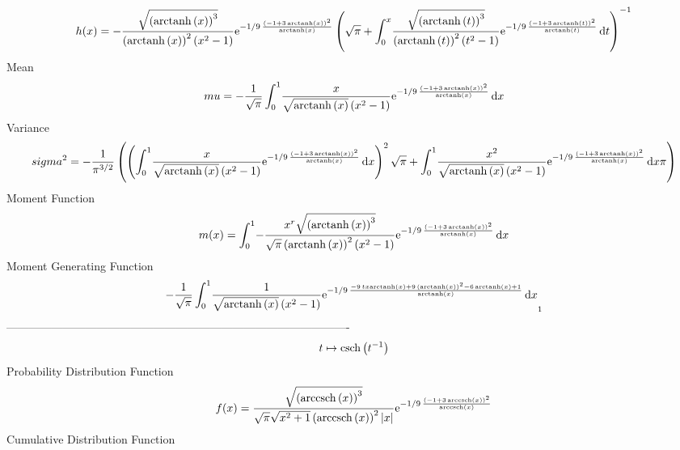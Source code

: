\documentclass[12pt]{article}
\begin{document}
 $$ h(x)=-{\frac {\sqrt { \left( {\rm arctanh} \left(x\right) \right) ^{3}}}{
 \left( {\rm arctanh} \left(x\right) \right) ^{2} \left( {x}^{2}-1
 \right) }{{\rm e}^{-1/9\,{\frac { \left( -1+3\,{\rm arctanh} \left(x
\right) \right) ^{2}}{{\rm arctanh} \left(x\right)}}}} \left( \sqrt {
\pi}+\int_{0}^{x}\!{\frac {\sqrt { \left( {\rm arctanh} \left(t\right)
 \right) ^{3}}}{ \left( {\rm arctanh} \left(t\right) \right) ^{2}
 \left( {t}^{2}-1 \right) }{{\rm e}^{-1/9\,{\frac { \left( -1+3\,
{\rm arctanh} \left(t\right) \right) ^{2}}{{\rm arctanh} \left(t
\right)}}}}}\,{\rm d}t \right) ^{-1}}
$$Mean 
 $$ mu=-{\frac {1}{\sqrt {\pi}}\int_{0}^{1}\!{\frac {x}{\sqrt {{\rm arctanh} 
\left(x\right)} \left( {x}^{2}-1 \right) }{{\rm e}^{-1/9\,{\frac {
 \left( -1+3\,{\rm arctanh} \left(x\right) \right) ^{2}}{{\rm arctanh}
 \left(x\right)}}}}}\,{\rm d}x}
$$ Variance 
 $$ sigma^2 = -{\frac {1}{{\pi}^{3/2}} \left(  \left( \int_{0}^{1}\!{\frac {x}{
\sqrt {{\rm arctanh} \left(x\right)} \left( {x}^{2}-1 \right) }{
{\rm e}^{-1/9\,{\frac { \left( -1+3\,{\rm arctanh} \left(x\right)
 \right) ^{2}}{{\rm arctanh} \left(x\right)}}}}}\,{\rm d}x \right) ^{2
}\sqrt {\pi}+\int_{0}^{1}\!{\frac {{x}^{2}}{\sqrt {{\rm arctanh} 
\left(x\right)} \left( {x}^{2}-1 \right) }{{\rm e}^{-1/9\,{\frac {
 \left( -1+3\,{\rm arctanh} \left(x\right) \right) ^{2}}{{\rm arctanh}
 \left(x\right)}}}}}\,{\rm d}x\pi \right) }
$$Moment Function 
 $$ m(x) = \int_{0}^{1}\!-{\frac {{x}^{r}\sqrt { \left( {\rm arctanh} \left(x
\right) \right) ^{3}}}{\sqrt {\pi} \left( {\rm arctanh} \left(x\right)
 \right) ^{2} \left( {x}^{2}-1 \right) }{{\rm e}^{-1/9\,{\frac {
 \left( -1+3\,{\rm arctanh} \left(x\right) \right) ^{2}}{{\rm arctanh}
 \left(x\right)}}}}}\,{\rm d}x
$$ Moment Generating Function 
 $$-{\frac {1}{\sqrt {\pi}}\int_{0}^{1}\!{\frac {1}{\sqrt {{\rm arctanh} 
\left(x\right)} \left( {x}^{2}-1 \right) }{{\rm e}^{-1/9\,{\frac {-9\,
tx{\rm arctanh} \left(x\right)+9\, \left( {\rm arctanh} \left(x\right)
 \right) ^{2}-6\,{\rm arctanh} \left(x\right)+1}{{\rm arctanh} \left(x
\right)}}}}}\,{\rm d}x}_{{1}}
$$-------------------------------------------------------------------------------------------  \\$$t\mapsto {\rm csch} \left({t}^{-1}\right)
$$Probability Distribution Function 
$$  f(x)={\frac {\sqrt { \left( {\rm arccsch} \left(x\right) \right) ^{3}}}{
\sqrt {\pi}\sqrt {{x}^{2}+1} \left( {\rm arccsch} \left(x\right)
 \right) ^{2} \left| x \right| }{{\rm e}^{-1/9\,{\frac { \left( -1+3\,
{\rm arccsch} \left(x\right) \right) ^{2}}{{\rm arccsch} \left(x
\right)}}}}}
$$Cumulative Distribution Function  
\end{document}
